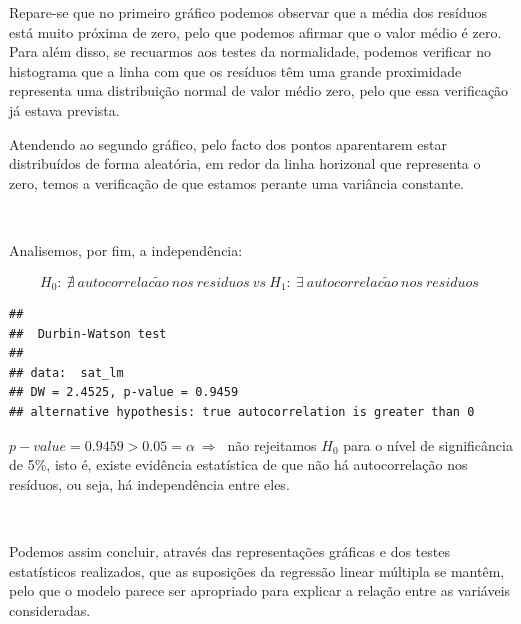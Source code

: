 \documentclass[]{article}
\begin{document}
Repare-se que no primeiro gráfico podemos observar que a média dos
resíduos está muito próxima de zero, pelo que podemos afirmar que o
valor médio é zero. Para além disso, se recuarmos aos testes da
normalidade, podemos verificar no histograma que a linha com que os
resíduos têm uma grande proximidade representa uma distribuição normal
de valor médio zero, pelo que essa verificação já estava prevista.

Atendendo ao segundo gráfico, pelo facto dos pontos aparentarem estar
distribuídos de forma aleatória, em redor da linha horizonal que
representa o zero, temos a verificação de que estamos perante uma
variância constante.

\(\ \)

Analisemos, por fim, a independência:

\begin{Shaded}
\begin{Highlighting}[]
 \NormalTok{)}
\end{Highlighting}
\end{Shaded}

\[
H_0:\ \nexists\ autocorrelac\tilde{a}o\ nos\ residuos\
vs\
H_1:\ \exists\ autocorrelac\tilde{a}o\ nos\ residuos\
\]

\begin{Shaded}
\begin{Highlighting}[]
\end{Highlighting}
\end{Shaded}

\begin{verbatim}
## 
##  Durbin-Watson test
## 
## data:  sat_lm
## DW = 2.4525, p-value = 0.9459
## alternative hypothesis: true autocorrelation is greater than 0
\end{verbatim}

\(p-value = 0.9459 > 0.05 = \alpha\ \Rightarrow\ \) não rejeitamos
\(H_0\) para o nível de significância de 5\%, isto é, existe evidência
estatística de que não há autocorrelação nos resíduos, ou seja, há
independência entre eles.

\(\ \)

Podemos assim concluir, através das representações gráficas e dos testes
estatísticos realizados, que as suposições da regressão linear múltipla
se mantêm, pelo que o modelo parece ser apropriado para explicar a
relação entre as variáveis consideradas.
\end{document}
